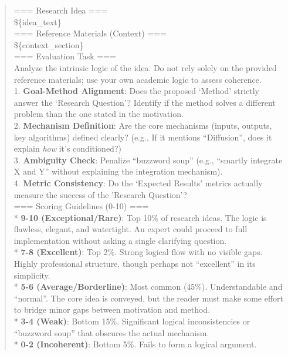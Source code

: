 \begin{quote}
\begin{tcolorbox}[breakable,colback=eval!20!white, colframe=eval!60!black, title=\textbf{Prompt for Evaluation Agent - Clarity}]
        === Research Idea ===\\
        \$\{idea\_text\}\\

        === Reference Materials (Context) ===\\
        \$\{context\_section\}\\

        === Evaluation Task ===\\
        Analyze the intrinsic logic of the idea. Do not rely solely on the provided reference materials; use your own academic logic to assess coherence.\\

        1.  \textbf{Goal-Method Alignment}: Does the proposed `Method' strictly answer the `Research Question'? Identify if the method solves a different problem than the one stated in the motivation.\\
        2.  \textbf{Mechanism Definition}: Are the core mechanisms (inputs, outputs, key algorithms) defined clearly? (e.g., If it mentions ``Diffusion'', does it explain \textit{how} it's conditioned?)\\
        3.  \textbf{Ambiguity Check}: Penalize ``buzzword soup'' (e.g., ``smartly integrate X and Y'' without explaining the integration mechanism).\\
        4.  \textbf{Metric Consistency}: Do the `Expected Results' metrics actually measure the success of the 'Research Question'?\\

        === Scoring Guidelines (0-10) ===\\
        * \textbf{9-10 (Exceptional/Rare)}: Top 10\% of research ideas. The logic is flawless, elegant, and watertight. An expert could proceed to full implementation without asking a single clarifying question.\\
        * \textbf{7-8 (Excellent)}: Top 2\%. Strong logical flow with no visible gaps. Highly professional structure, though perhaps not ``excellent'' in its simplicity.\\
        * \textbf{5-6 (Average/Borderline)}: Most common (45\%). Understandable and ``normal''. The core idea is conveyed, but the reader must make some effort to bridge minor gaps between motivation and method.\\
        * \textbf{3-4 (Weak)}: Bottom 15\%. Significant logical inconsistencies or ``buzzword soup'' that obscures the actual mechanism.\\
        * \textbf{0-2 (Incoherent)}: Bottom 5\%. Fails to form a logical argument.\\


\end{tcolorbox}
\end{quote}
